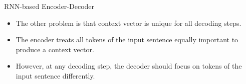 

    
            
            


            


\begin{frame}{RNN-based Encoder-Decoder}
\begin{itemize}
    \item The other problem is that context vector is unique for all decoding steps.
    \item The encoder treats all tokens of the input sentence equally important to produce a context vector. 
    \item However, at any decoding step, the decoder should focus on tokens of the input sentence differently. 
\end{itemize}
\end{frame}


